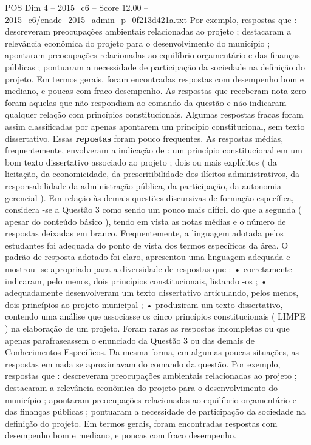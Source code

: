 \begin{textsample}{POS Dim 4 – 2015\_c6 – Score 12.00 – 2015\_c6/enade\_2015\_admin\_p\_0f213d421a.txt}
Por exemplo, respostas que : descreveram preocupações ambientais relacionadas ao projeto ; destacaram a relevância econômica do projeto para o desenvolvimento do município ; apontaram preocupações relacionadas ao equilíbrio orçamentário e das finanças públicas ; pontuaram a necessidade de participação da sociedade na definição do projeto.
Em termos gerais, foram encontradas respostas com desempenho bom e mediano, e poucas com fraco desempenho.
As respostas que receberam nota zero foram aquelas que não respondiam ao comando da questão e não indicaram qualquer relação com princípios constitucionais.
Algumas respostas fracas foram assim classificadas por apenas apontarem um princípio constitucional, sem texto dissertativo.
Essas \textbf{repostas} foram pouco frequentes.
As respostas médias, frequentemente, envolveram a indicação de : um princípio constitucional em um bom texto dissertativo associado ao projeto ; dois ou mais explícitos ( da licitação, da economicidade, da prescritibilidade dos ilícitos administrativos, da responsabilidade da administração pública, da participação, da autonomia gerencial ).
Em relação às demais questões discursivas de formação específica, considera -se a Questão 3 como sendo um pouco mais difícil do que a segunda ( apesar do conteúdo básico ), tendo em vista as notas médias e o número de respostas deixadas em branco.
Frequentemente, a linguagem adotada pelos estudantes foi adequada do ponto de vista dos termos específicos da área.
O padrão de resposta adotado foi claro, apresentou uma linguagem adequada e mostrou -se apropriado para a diversidade de respostas que : • corretamente indicaram, pelo menos, dois princípios constitucionais, listando -os ; • adequadamente desenvolveram um texto dissertativo articulando, pelos menos, dois princípios ao projeto municipal ; • produziram um texto dissertativo, contendo uma análise que associasse os cinco princípios constitucionais ( LIMPE ) na elaboração de um projeto.
Foram raras as respostas incompletas ou que apenas parafraseassem o enunciado da Questão 3 ou das demais de Conhecimentos Específicos.
Da mesma forma, em algumas poucas situações, as respostas em nada se aproximavam do comando da questão.
Por exemplo, respostas que : descreveram preocupações ambientais relacionadas ao projeto ; destacaram a relevância econômica do projeto para o desenvolvimento do município ; apontaram preocupações relacionadas ao equilíbrio orçamentário e das finanças públicas ; pontuaram a necessidade de participação da sociedade na definição do projeto.
Em termos gerais, foram encontradas respostas com desempenho bom e mediano, e poucas com fraco desempenho.

\end{textsample}
